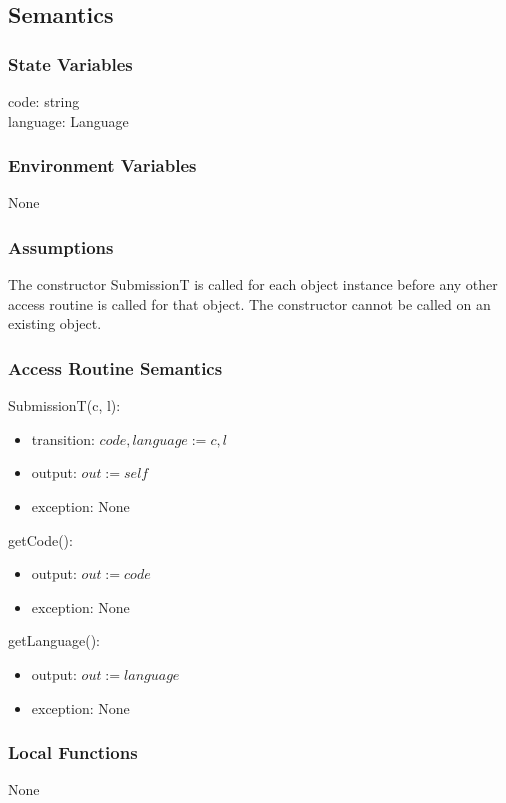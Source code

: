 \documentclass[12pt, titlepage]{article}
\begin{document}
\subsection{Semantics}

\subsubsection{State Variables}

code: string\\
language: Language

\subsubsection{Environment Variables}
None

\subsubsection{Assumptions}
The constructor SubmissionT is called for each object instance before any other access routine is called for that object. The constructor cannot be called on an existing object.

\subsubsection{Access Routine Semantics}

\noindent SubmissionT(c, l):
\begin{itemize}
\item transition: $code, language := c, l$
\item output: $out := self$
\item exception: None
\end{itemize}

\noindent getCode():
\begin{itemize}
\item output: $out := code$
\item exception: None
\end{itemize}

\noindent getLanguage():
\begin{itemize}
\item output: $out := language$
\item exception: None
\end{itemize}

\subsubsection{Local Functions}
None
\end{document}
